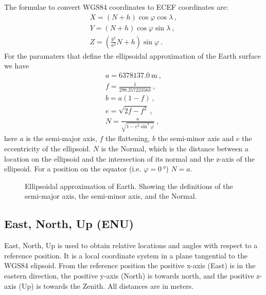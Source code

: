 The formulae to convert WGS84 coordinates to ECEF coordinates are:
%
\begin{equation}
    \begin{array}{l}
        X = \left(N + h\right) \cos{\varphi} \cos{\lambda} \ , \\
        Y = \left(N + h\right) \cos{\varphi} \sin{\lambda} \ , \\
        Z = \left(\frac{b^2}{a^2} N + h\right) \sin{\varphi} \ .
    \end{array}
\end{equation}
%
For the paramaters that define the ellipsoidal approximation of the
Earth surface we have
%
\begin{equation}
    \label{eq:wgs84}
    \begin{array}{l}
        a = \SI{6378137.0}{\meter} \ , \\
        f = \frac{1}{298.257223563} \ , \\
        b = a (1 - f) \ , \\
        e = \sqrt{2 f - f^2} \ , \\
        N = \frac{a}{\sqrt{1 - e^2 \sin^2 \varphi}} \ ,
    \end{array}
\end{equation}
%
here $a$ is the semi-major axis, $f$ the flattening, $b$ the
semi-minor axis and $e$ the eccentricity of the ellipsoid. $N$ is the
Normal, which is the distance between a location on the ellipsoid and
the intersection of its normal and the z-axis of the ellipsoid. For a
position on the equator (i.e. $\varphi = \SI{0}{\degree}$) $N = a$.

\begin{figure}
    \centering
    
    \caption{Ellipsoidal approximation of Earth. Showing the definitions
             of the semi-major axis, the semi-minor axis, and the Normal.}
    \label{fig:ellipsoid}
\end{figure}


\subsection{East, North, Up (ENU)}

East, North, Up is used to obtain relative locations and angles with
respect to a reference position. It is a local coordinate system in a
plane tangential to the WGS84 elipsoid. From the reference position the
positive x-axis (East) is in the eastern direction, the positive y-axis
(North) is towards north, and the positive z-axis (Up) is towards the
Zenith. All distances are in meters.


